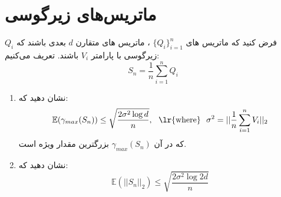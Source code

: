 \section{ماتریس‌های زیرگوسی}
فرض کنید که ماتریس های 
$\{Q_i\}_{i=1}^{n}$
،
ماتریس های متقارن
$d$
بعدی باشند که 
$Q_i$
زیرگوسی با پارامتر
$V_i$
باشند.
تعریف می‌کنیم:
$$S_n= \frac{1}{n} \sum_{i=1}^{n} Q_i$$
\begin{enumerate}
    \item 
    نشان دهید که:
    $$\mathbb{E}(\gamma_{max}(S_n)) \leq \sqrt{\frac{2 \sigma^2 \log{d}}{n}}, \ \ \text{\lr{where}} \ \ \sigma^2= ||\frac{1}{n} \sum_{i=1}^{n} V_i||_2 $$
    که در آن 
    $\gamma_{max}(S_n)$
    بزرگترین مقدار ویژه است.
    \item
    نشان دهید که:
    $$\mathbb{E}(||S_n||_2) \leq \sqrt{\frac{2 \sigma^2 \log{2d}}{n}}$$
\end{enumerate}
